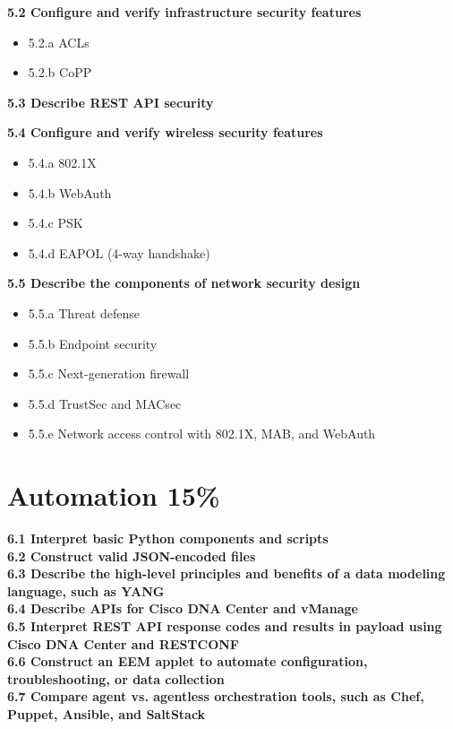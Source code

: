 \documentclass{article}
\begin{document}
\noindent\textbf{5.2 Configure and verify infrastructure security features}
\begin{itemize}
\item 5.2.a ACLs
\item 5.2.b CoPP
\end{itemize}

\noindent\textbf{5.3 Describe REST API security}

\noindent\textbf{5.4 Configure and verify wireless security features}
\begin{itemize}
\item 5.4.a 802.1X
\item 5.4.b WebAuth
\item 5.4.c PSK
\item 5.4.d EAPOL (4-way handshake)
\end{itemize}

\noindent\textbf{5.5 Describe the components of network security design}
\begin{itemize}
\item 5.5.a Threat defense
\item 5.5.b Endpoint security
\item 5.5.c Next-generation firewall
\item 5.5.d TrustSec and MACsec
\item 5.5.e Network access control with 802.1X, MAB, and WebAuth
\end{itemize}

\newpage
\section{Automation 15\%}
\noindent\textbf{6.1 Interpret basic Python components and scripts}\\
\noindent\textbf{6.2 Construct valid JSON-encoded files}\\
\noindent\textbf{6.3 Describe the high-level principles and benefits of a data modeling language, such as YANG}\\
\noindent\textbf{6.4 Describe APIs for Cisco DNA Center and vManage}\\
\noindent\textbf{6.5 Interpret REST API response codes and results in payload using Cisco DNA Center and RESTCONF}\\
\noindent\textbf{6.6 Construct an EEM applet to automate configuration, troubleshooting, or data collection}\\



\noindent\textbf{6.7 Compare agent vs. agentless orchestration tools, such as Chef, Puppet, Ansible, and SaltStack}\\
\end{document}
